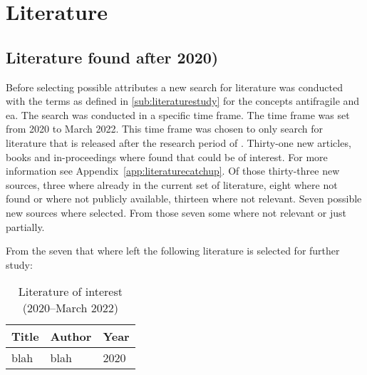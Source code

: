 \chapter{Literature}

\section{Literature found after 2020)}
\label{sec:literaturefoundafter2020}
Before selecting possible attributes a new search for literature was conducted with the terms as defined in \cref{sub:literaturestudy} for the concepts \gls{antifragile} and \acrshort{ea}. The search was conducted in a specific time frame. The time frame was set from 2020 to March 2022. This time frame was chosen to only search for literature that is released after the research period of \textcite{Botjes2020}. Thirty-one new articles, books and in-proceedings where found that could be of interest. For more information see Appendix~\ref{app:literaturecatchup}. Of those thirty-three new sources, three where already in the current set of literature, eight where not found or where not publicly available, thirteen where not relevant. Seven possible new sources where selected. From those seven some where not relevant or just partially.

From the seven that where left the following literature is selected for further study:

\begin{table}[H]
	\centering
	\begin{tabular}{p{}p{}p{}}
		\toprule%
		\textbf{Title} & \textbf{Author} & \textbf{Year} \\
		\midrule %
		blah & blah & 2020 \\%
		\bottomrule
	\end{tabular}
	\caption[Literature of interest (2020--March 2022)]{Literature of interest (2020--March 2022)}
	\label{tab:literatureafter2020}
\end{table}
